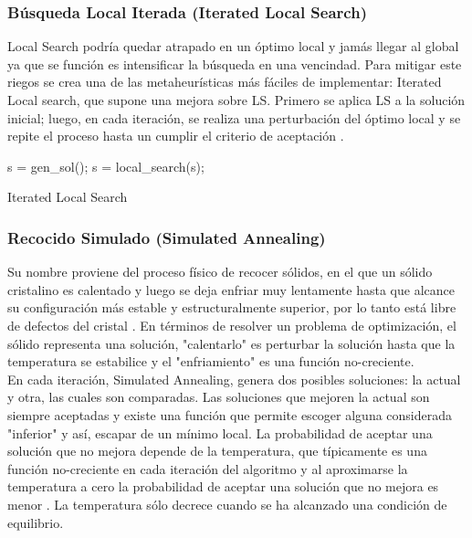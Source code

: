 \documentclass{ci5652}
\begin{document}

\subsubsection{Búsqueda Local Iterada (Iterated Local Search)}

Local Search podría quedar atrapado en un óptimo local y jamás llegar al global ya que se función es intensificar la búsqueda en una vencindad. Para mitigar
este riegos se crea una de las metaheurísticas más fáciles de implementar:
Iterated Local search, que supone una mejora sobre LS. Primero se aplica LS a la
solución inicial; luego, en cada iteración, se realiza una perturbación del
óptimo local y se repite el proceso hasta un cumplir el criterio de aceptación
\cite{Talbi_2009}.\\

\begin{algorithm}
 \DontPrintSemicolon
 \vspace*{0.1cm}
  s = gen\_sol();\;
  s = local\_search(s);\;
 \vspace*{0.1cm}
 \caption{Iterated Local Search}
\end{algorithm}



\subsubsection{Recocido Simulado (Simulated Annealing)}

Su nombre proviene del proceso físico de recocer sólidos, en el que un sólido 
cristalino es calentado y luego se deja enfriar muy lentamente hasta que alcance
su configuración más estable y estructuralmente superior, por lo tanto está 
libre de defectos del cristal \cite{Glover_2003}. En términos de resolver un 
problema de optimización, el sólido representa una solución, "calentarlo" es 
perturbar la solución hasta que la temperatura se estabilice y el "enfriamiento"
es una función no-creciente.\\

En cada iteración, Simulated Annealing, genera dos posibles soluciones: la 
actual y otra, las cuales son comparadas. Las soluciones que mejoren la actual 
son siempre aceptadas y existe una función que permite escoger alguna 
considerada "inferior" y así, escapar de un mínimo local. La probabilidad de
aceptar una solución que no mejora depende de la temperatura, que típicamente es
una función no-creciente en cada iteración del algoritmo y al aproximarse la
temperatura a cero la probabilidad de aceptar una solución que no mejora es 
menor \cite{Glover_2003}. La temperatura sólo decrece cuando se ha alcanzado una 
condición de equilibrio.\\ 
\end{document}
